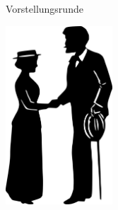 \documentclass[hyperref={pdfpagelabels=false},ngerman]{beamer}
\begin{document}

\begin{frame}{Vorstellungsrunde}
  \begin{center}
    \includegraphics[width=0.3\textwidth]{images/haende_mann-frau}
  \end{center}
\end{frame}
\end{document}
